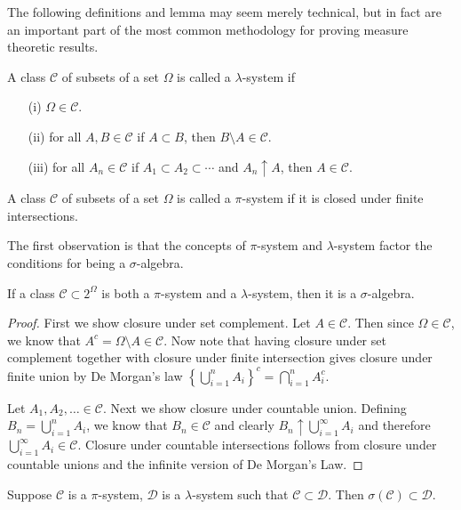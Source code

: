 
The following definitions and lemma may seem merely technical, but in fact are
an important part of the most common methodology for proving measure
theoretic results.  
\begin{defn}A class $\mathcal{C}$ of subsets of a set $\Omega$ is called a $\lambda$-system if
\begin{itemize}
\item[(i)] $\Omega \in \mathcal{C} $.
\item[(ii)] for all $A,B \in \mathcal{C}$ if $A \subset B$, then
  $B \setminus A \in \mathcal{C}$.
\item[(iii)] for all $A_n \in
  \mathcal{C}$ if $A_1 \subset A_2 \subset \cdots$ and $A_n \uparrow A$, then $A \in \mathcal{C}$.
\end{itemize}
\end{defn}
\begin{defn}A class $\mathcal{C}$ of subsets of a set $\Omega$ is
  called a $\pi$-system if it is closed under finite intersections.
\end{defn}
The first observation is that the concepts of $\pi$-system and
$\lambda$-system factor the conditions for being a $\sigma$-algebra.
\begin{lem}\label{PiLambdaSigma}If a class $\mathcal{C} \subset 2^\Omega$ is both a
  $\pi$-system and a $\lambda$-system, then it is a $\sigma$-algebra.
\end{lem}
\begin{proof}
First we show closure under set complement.  Let $A \in \mathcal{C}$.
Then since $\Omega \in \mathcal{C}$, we know that $A^c = \Omega
\setminus A \in \mathcal{C}$.  Now note that having closure under set complement
together with closure under finite intersection gives closure under
finite union by De Morgan's law $\left \{ \bigcup_{i=1}^n A_i \right \} ^
c =  \bigcap_{i=1}^n A_i^c $.

Let $A_1, A_2, \dots \in \mathcal{C}$.  Next we show closure under
countable union.  Defining $B_n = \bigcup_{i=1}^n A_i$, we know that
$B_n \in \mathcal{C}$ and clearly $B_n \uparrow \bigcup_{i=1}^\infty
A_i$ and therefore $\bigcup_{i=1}^\infty A_i \in \mathcal{C}$.
Closure under countable intersections follows from closure under
countable unions and the infinite version of De Morgan's Law.
\end{proof}
\begin{thm}\label{MonotoneClassTheorem}Suppose $\mathcal{C}$ is a $\pi$-system, $\mathcal{D}$ is a
  $\lambda$-system such that $\mathcal{C} \subset \mathcal{D}$.  Then
  $\sigma(\mathcal{C}) \subset \mathcal{D}$.
\end{thm}
